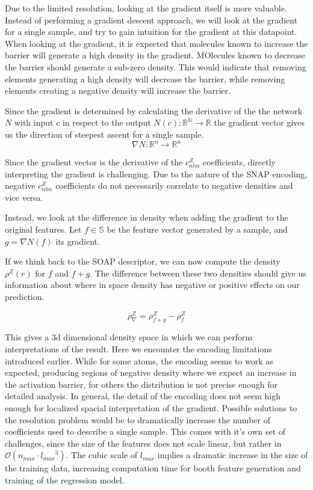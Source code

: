 Due to the limited resolution, looking at the gradient itself is more valuable.
Instead of performing a gradient descent approach, we will look at the gradient for a single sample,
and try to gain intuition for the gradient at this datapoint.
When looking at the gradient, it is expected that molecules known to increase the barrier will generate a high density in the gradient.
MOlecules known to decrease the barrier should generate a sub-zero density.
This would indicate that removing elements generating a high density will decrease the barrier,
while removing elements creating a negative density will increase the barrier.

Since the gradient is determined by calculating the derivative of the the network $N$ with input $c$ in respect to the output $N(c): \mathbb{R^N} \to \mathbb{R}$
the gradient vector gives us the direction of steepest ascent for a single sample.
$$
\nabla N: \mathbb{R}^n  \to \mathbb{R}^n 
$$

Since the gradient vector is the derivative of the $c_{nlm}^Z$ coefficients, 
directly interpreting the gradient is challenging. 
Due to the nature of the SNAP encoding, negative $c_{nlm}^Z$ coefficients do not necessarily correlate to negative densities and vice versa.

Instead, we look at the difference in density when adding the gradient to the original features.
Let $f \in \mathbb{S}$ be the feature vector generated by a sample, and $g = \nabla N(f)$ its gradient.

If we think back to the SOAP descriptor, we can now compute the density $\rho^Z(r)$ for $f$ and $f + g$.
The difference between these two densities should give us information about where in space density has negative or positive effects on our prediction.

$$ \rho^Z_\nabla = \rho^Z_{f+g} -  \rho^Z_{f} $$

This gives a 3d dimensional density space in which we can perform interpretations of the result. %
Here we encounter the encoding limitations introduced earlier.
While for some atoms, the encoding seems to work as expected, producing regions of negative density where we expect
an increase in the activation barrier, for others the distribution is not precise enough for detailed analysis.
In general, the detail of the encoding does not seem high enough for localized spacial interpretation of the gradient.
Possible solutions to the resolution problem would be to dramatically increase the number of coefficients used to describe a single sample.
This comes with it's own set of challenges, since the size of the features does not scale linear, but rather in $\mathcal{O}(n_{max} \cdot {l_{max}}^3)$.
The cubic scale of $l_{max}$ implies a dramatic increase in the size of the training data, increasing computation time for booth feature generation and training of the regression model.


